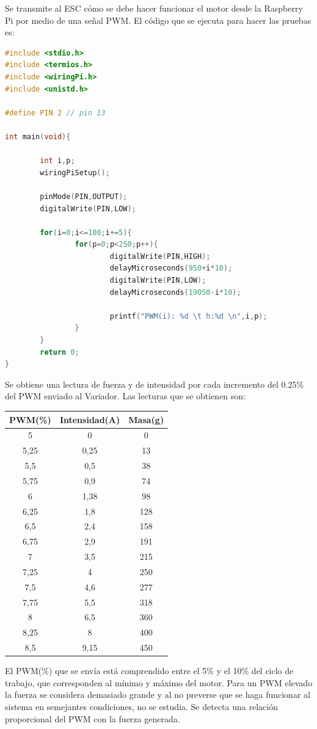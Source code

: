 \documentclass[twoside,11pt]{book}
\begin{document}
Se transmite al ESC cómo se debe hacer funcionar el motor desde la Raspberry Pi por medio de una señal PWM. El código que se ejecuta para hacer las pruebas es:
\singlespacing
\begin{lstlisting}[language=C]
#include <stdio.h>
#include <termios.h>
#include <wiringPi.h>
#include <unistd.h>

#define PIN 2 // pin 13

int main(void){

        int i,p;
        wiringPiSetup();

        pinMode(PIN,OUTPUT);
        digitalWrite(PIN,LOW);

        for(i=0;i<=100;i+=5){
                for(p=0;p<250;p++){
                        digitalWrite(PIN,HIGH);
                        delayMicroseconds(950+i*10);
                        digitalWrite(PIN,LOW);
                        delayMicroseconds(19050-i*10);

                        printf("PWM(i): %d \t h:%d \n",i,p);
                }
        }
        return 0;
}
\end{lstlisting}
\onehalfspacing 
Se obtiene una lectura de fuerza y  de intensidad por cada incremento del 0.25\% del PWM enviado al Variador. Las lecturas que se obtienen son: 

\begin{center}
\begin{tabular}{|c|c|c|}
\hline
\textbf{PWM(\%)} & \textbf{Intensidad(A)} & \textbf{Masa(g)} \\
\hline
\hline
5    &	  0 &   0 \\
\hline
5,25 & 0,25 &  13 \\
\hline
5,5	 &  0,5 &  38 \\
\hline
5,75 &  0,9 &  74 \\
\hline
6    & 1,38 &  98 \\
\hline
6,25	 &  1,8 & 128 \\
\hline
6,5  &	2,4 & 158 \\
\hline
6,75 & 	2,9 & 191 \\
\hline
7    &	3,5 & 215 \\
\hline
7,25 &  	  4	& 250 \\
\hline
7,5  & 	4,6 & 277 \\
\hline
7,75	 &  5,5 & 318 \\
\hline
8    &	6,5	& 360 \\
\hline
8,25 &    8 & 400 \\
\hline
8,5  & 9,15 & 450 \\
\hline
\end{tabular}
\end{center}
El PWM(\%) que se envía está comprendido entre el 5\% y el 10\% del ciclo de trabajo, que corresponden al mínimo y máximo del motor. Para un PWM elevado la fuerza se considera demasiado grande y al no preverse que se haga funcionar al sistema en semejantes condiciones, no se estudia. Se detecta una relación proporcional del PWM con la fuerza generada.
\end{document}
